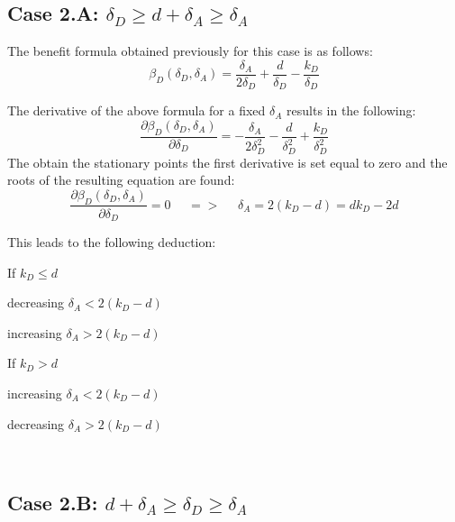 \subsection*{Case 2.A: $\delta_{D} \geq d+\delta_{A} \geq \delta_{A} $ }

The benefit formula obtained previously for this case is as follows:
\begin{equation*}
\beta_{D}(\delta_{D},\delta_{A})= \dfrac{\delta_{A}}{2\delta_{D}} + \dfrac{d}{\delta_{D}} - \dfrac{k_{D}}{\delta_{D}}
\end{equation*}

The derivative of the above formula for a fixed $\delta_{A}$ results in the following:
\begin{equation*}
\frac{\partial \beta_{D}(\delta_{D},\delta_{A})}{\partial \delta_{D}} = -\dfrac{\delta_{A}}{2\delta_{D}^{2}} - \dfrac{d}{\delta_{D}^{2}} + \dfrac{k_{D}}{\delta_{D}^{2}}
\end{equation*}
The obtain the stationary points the first derivative is set equal to zero and the roots of the resulting equation are found:
\begin{equation*}
\frac{\partial \beta_{D}(\delta_{D},\delta_{A})}{\partial \delta_{D}} =0 ~~~~~~ =>~~~~~~ \delta_{A} = 2(k_{D}-d) = dk_{D} - 2d
\end{equation*}

This leads to the following deduction:
\begin{description}
\item If $k_{D} \leq d$ 
\begin{description}
\item decreasing $ \delta_{A} < 2(k_{D} -d)$
\item increasing  $\delta_{A} > 2(k_{D} -d)$ 
\end{description}
\item If $k_{D} > d$ 
\begin{description}
\item increasing $ \delta_{A} < 2(k_{D} -d)$
\item decreasing  $\delta_{A} > 2(k_{D} -d)$ 
\end{description}
\end{description}
~~\\

\subsection*{Case 2.B: $d+\delta_{A} \geq \delta_{D} \geq  \delta_{A} $} 

